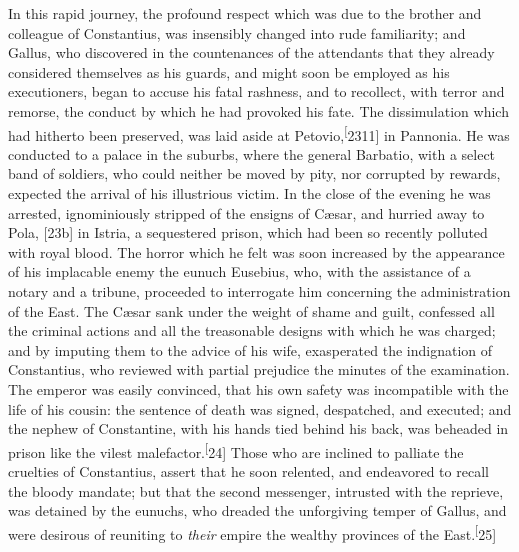 In this rapid journey, the profound respect which was due to the
brother and colleague of Constantius, was insensibly changed into
rude familiarity; and Gallus, who discovered in the countenances
of the attendants that they already considered themselves as his
guards, and might soon be employed as his executioners, began to
accuse his fatal rashness, and to recollect, with terror and
remorse, the conduct by which he had provoked his fate. The
dissimulation which had hitherto been preserved, was laid aside
at Petovio,\textsuperscript[2311] in Pannonia. He was conducted to a palace in the
suburbs, where the general Barbatio, with a select band of
soldiers, who could neither be moved by pity, nor corrupted by
rewards, expected the arrival of his illustrious victim. In the
close of the evening he was arrested, ignominiously stripped of
the ensigns of Cæsar, and hurried away to Pola, [23b] in Istria,
a sequestered prison, which had been so recently polluted with
royal blood. The horror which he felt was soon increased by the
appearance of his implacable enemy the eunuch Eusebius, who, with
the assistance of a notary and a tribune, proceeded to
interrogate him concerning the administration of the East. The
Cæsar sank under the weight of shame and guilt, confessed all the
criminal actions and all the treasonable designs with which he
was charged; and by imputing them to the advice of his wife,
exasperated the indignation of Constantius, who reviewed with
partial prejudice the minutes of the examination. The emperor was
easily convinced, that his own safety was incompatible with the
life of his cousin: the sentence of death was signed, despatched,
and executed; and the nephew of Constantine, with his hands tied
behind his back, was beheaded in prison like the vilest
malefactor.\textsuperscript[24] Those who are inclined to palliate the cruelties
of Constantius, assert that he soon relented, and endeavored to
recall the bloody mandate; but that the second messenger,
intrusted with the reprieve, was detained by the eunuchs, who
dreaded the unforgiving temper of Gallus, and were desirous of
reuniting to \textit{their} empire the wealthy provinces of the East.\textsuperscript[25]


